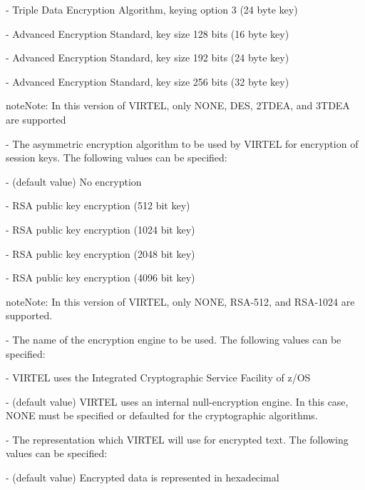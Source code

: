 \documentclass[letterpaper,10pt,english]{sphinxmanual}
\begin{document}
 - Triple Data Encryption Algorithm, keying option 3 (24 byte key)

 - Advanced Encryption Standard, key size 128 bits (16 byte key)

 - Advanced Encryption Standard, key size 192 bits (24 byte key)

 - Advanced Encryption Standard, key size 256 bits (32 byte key)

\begin{sphinxadmonition}{note}{Note:}
In this version of VIRTEL, only NONE, DES, 2TDEA, and 3TDEA are supported
\end{sphinxadmonition}

 - The asymmetric encryption algorithm to be used by VIRTEL for encryption of session keys. The following values can be specified:

 - (default value) No encryption

 - RSA public key encryption (512 bit key)

 - RSA public key encryption (1024 bit key)

 - RSA public key encryption (2048 bit key)

 - RSA public key encryption (4096 bit key)

\begin{sphinxadmonition}{note}{Note:}
In this version of VIRTEL, only NONE, RSA-512, and RSA-1024 are supported.
\end{sphinxadmonition}

 - The name of the encryption engine to be used. The following values can be specified:

 - VIRTEL uses the Integrated Cryptographic Service Facility of z/OS

 - (default value) VIRTEL uses an internal null-encryption engine. In this case, NONE must be specified or defaulted for the cryptographic algorithms.

 - The representation which VIRTEL will use for encrypted text. The following values can be specified:

 - (default value) Encrypted data is represented in hexadecimal
\end{document}

